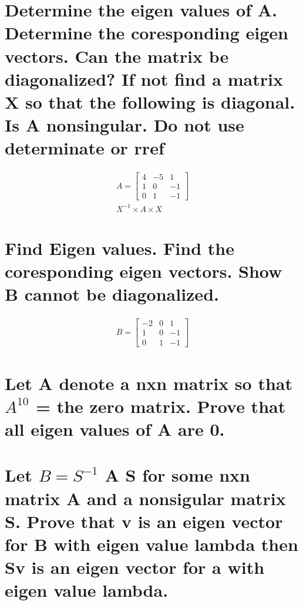 \documentclass{assignment}
\begin{document}
\section{Determine the eigen values of A. Determine the coresponding eigen vectors. Can the matrix be diagonalized? If not find a matrix X so that the following is diagonal. Is A nonsingular. Do not use determinate or rref}

\begin{align}
  A = \begin{bmatrix}
    4 & -5 & 1 \\
    1 & 0 & -1 \\
    0 & 1 & -1
  \end{bmatrix} \\
  X^{-1} \times A \times X
\end{align}

\newpage

\section{Find Eigen values. Find the coresponding eigen vectors. Show B cannot be diagonalized.}

\begin{align}
  B = \begin{bmatrix}
    -2 & 0 & 1 \\
    1 & 0 & -1 \\
    0 & 1 & -1
  \end{bmatrix}
\end{align}

\newpage

\section{Let A denote a nxn matrix so that $A^{10}$ = the zero matrix. Prove that all eigen values of A are 0.}

\newpage

\section{Let $B = S^{-1}$ A S for some nxn matrix A and a nonsigular matrix S. Prove that v is an eigen vector for B with eigen value lambda then Sv is an eigen vector for a with eigen value lambda.}
  
\end{document}

